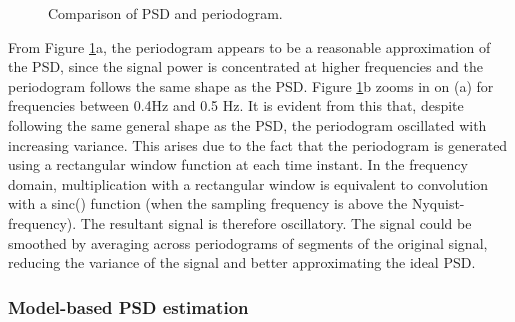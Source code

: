 \begin{figure}[H]
    \centering
    \caption{Comparison of PSD and periodogram.}
    \label{fig:pgmandzoom}
\end{figure}

\noindent
From Figure \ref{fig:pgmandzoom}a, the periodogram appears to be a reasonable approximation of the PSD, since the signal power is concentrated at higher frequencies and the periodogram follows the same shape as the PSD. Figure \ref{fig:pgmandzoom}b zooms in on (a) for frequencies between 0.4Hz and 0.5 Hz. It is evident from this that, despite following the same general shape as the PSD, the periodogram oscillated with increasing variance. This arises due to the fact that the periodogram is generated using a rectangular window function at each time instant. In the frequency domain, multiplication with a rectangular window is equivalent to convolution with a sinc() function (when the sampling frequency is above the Nyquist-frequency). The resultant signal is therefore oscillatory. The signal could be smoothed by averaging across periodograms of segments of the original signal, reducing the variance of the signal and better approximating the ideal PSD.

\subsubsection{Model-based PSD estimation}

